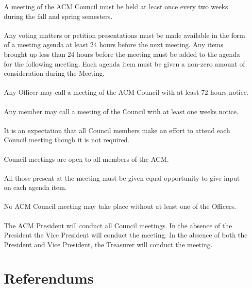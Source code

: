 \documentclass[12pt,titlepage]{article}
\begin{document}
A meeting of the ACM Council must be held at least once every two weeks during the fall and spring semesters.\\
\\
Any voting matters or petition presentations must be made available in the form of a meeting agenda at least 24 hours before the next meeting. Any items brought up less than 24 hours before the meeting must be added to the agenda for the following meeting. Each agenda item must be given a non-zero amount of consideration during the Meeting.\\
\\
Any Officer may call a meeting of the ACM Council with at least 72 hours notice.\\
\\
Any member may call a meeting of the Council with at least one weeks notice.\\
\\
It is an expectation that all Council members make an effort to attend each Council meeting though it is not required.\\
\\
Council meetings are open to all members of the ACM.\\
\\
All those present at the meeting must be given equal opportunity to give input on each agenda item.\\
\\
No ACM Council meeting may take place without at least one of the Officers.\\
\\
The ACM President will conduct all Council meetings. In the absence of the President the Vice President will conduct the meeting. In the absence of both the President and Vice President, the Treasurer will conduct the meeting.

\section{Referendums}
\end{document}
